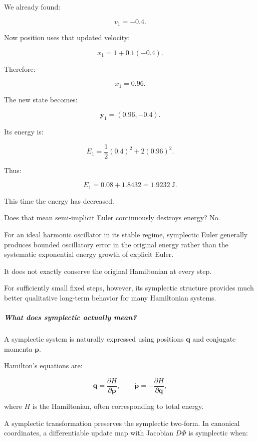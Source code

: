 \hypertarget{02-foundations-ii-ch025-deriving-the-update-for-the-same-spring}{}

We already found:

\[
v_1=-0.4.
\]

Now position uses that updated velocity:

\[
x_1=1+0.1(-0.4).
\]

Therefore:

\[
\boxed{x_1=0.96}.
\]

The new state becomes:

\[
\boxed{\mathbf y_1=(0.96,-0.4)}.
\]

Its energy is:

\[
E_1= \frac12(0.4)^2+ 2(0.96)^2.
\]

Thus:

\[
E_1=0.08+1.8432=\boxed{1.9232\ \mathrm J}.
\]

This time the energy has decreased.

Does that mean semi-implicit Euler continuously destroys energy? No.

For an ideal harmonic oscillator in its stable regime, symplectic Euler generally produces bounded oscillatory error in the original energy rather than the systematic exponential energy growth of explicit Euler.

It does not exactly conserve the original Hamiltonian at every step.

For sufficiently small fixed steps, however, its symplectic structure provides much better qualitative long-term behavior for many Hamiltonian systems.

\subparagraph{What does symplectic actually mean?}\label{02-foundations-ii-ch025-what-does-symplectic-actually-mean}

\hypertarget{02-foundations-ii-ch025-what-does-symplectic-actually-mean}{}

A symplectic system is naturally expressed using positions \(\mathbf q\) and conjugate momenta \(\mathbf p\).

Hamilton's equations are:

\[
\dot{\mathbf q}=\frac{\partial H}{\partial\mathbf p}, \qquad \dot{\mathbf p}=-\frac{\partial H}{\partial\mathbf q},
\]

where \(H\) is the Hamiltonian, often corresponding to total energy.

A symplectic transformation preserves the symplectic two-form. In canonical coordinates, a differentiable update map with Jacobian \(D\Phi\) is symplectic when:

